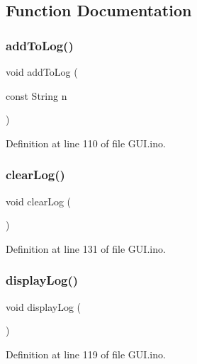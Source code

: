 \subsection{Function Documentation}
\mbox{\label{_g_u_i_8ino_a138c0032519f7273647d99d811789e9d}} 
\subsubsection{\texorpdfstring{addToLog()}{addToLog()}}
{\footnotesize\ttfamily void add\+To\+Log (\begin{DoxyParamCaption}\item[{const String}]{n }\end{DoxyParamCaption})}



Definition at line 110 of file G\+U\+I.\+ino.

\mbox{\label{_g_u_i_8ino_ae2d5212eb62104cb3219318f03f23734}} 
\subsubsection{\texorpdfstring{clearLog()}{clearLog()}}
{\footnotesize\ttfamily void clear\+Log (\begin{DoxyParamCaption}{ }\end{DoxyParamCaption})}



Definition at line 131 of file G\+U\+I.\+ino.

\mbox{\label{_g_u_i_8ino_a08da0e1bab37e09ab0e424b1693c2fe0}} 
\subsubsection{\texorpdfstring{displayLog()}{displayLog()}}
{\footnotesize\ttfamily void display\+Log (\begin{DoxyParamCaption}{ }\end{DoxyParamCaption})}



Definition at line 119 of file G\+U\+I.\+ino.

\mbox{\label{_g_u_i_8ino_a6d2ae46e53ca384472c7c54d3a75ef38}} 
